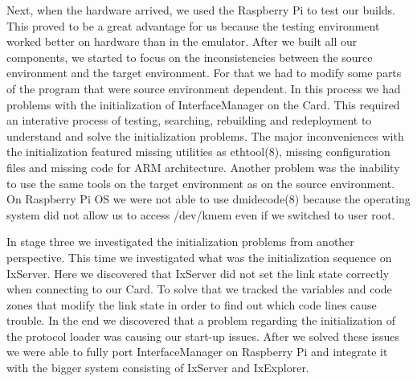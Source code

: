 Next, when the hardware arrived, we used the Raspberry Pi to test our builds.
This proved to be a great advantage for us because the testing environment
worked better on hardware than in the emulator. After we built all our
components, we started to focus on the inconsistencies between the source
environment and the target environment. For that we had to modify some parts of
the program that were source environment dependent. In this process we had
problems with the initialization of InterfaceManager on the Card. This required
an interative process of testing, searching, rebuilding and redeployment to
understand and solve the initialization problems. The major inconveniences with
the initialization featured missing utilities as ethtool(8), missing
configuration files and missing code for ARM architecture. Another problem was
the inability to use the same tools on the target environment as on the source
environment. On Raspberry Pi OS we were not able to use dmidecode(8) because the
operating system did not allow us to access /dev/kmem even if we switched to
user root.

In stage three we investigated the initialization problems from another
perspective. This time we investigated what was the initialization sequence on
IxServer. Here we discovered that IxServer did not set the link state correctly
when connecting to our Card. To solve that we tracked the variables and code
zones that modify the link state in order to find out which code lines cause
trouble. In the end we discovered that a problem regarding the initialization
of the protocol loader was causing our start-up issues. After we solved
these issues we were able to fully port InterfaceManager on Raspberry Pi and
integrate it with the bigger system consisting of IxServer and IxExplorer.
